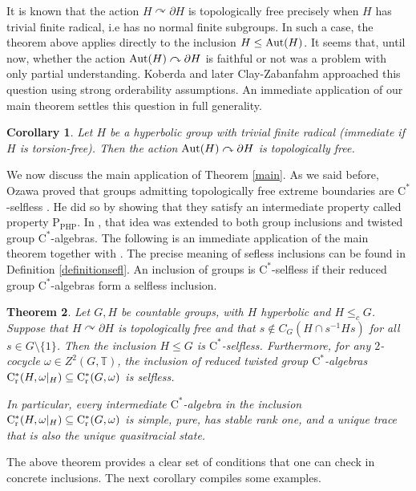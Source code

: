 \documentclass[11pt]{article}
\newtheorem{thm}{Theorem}[section]
\newtheorem{cor}[thm]{Corollary}
\theoremstyle{definition}
\theoremstyle{remark}
\numberwithin{equation}{section}
\numberwithin{equation}{section}
\newcommand{\Cs}{\ensuremath{\mathrm{C}^\ast}}
\newcommand{\Csr}{\mathrm{C}^\ast_{\rm r}}
\numberwithin{equation}{section}
\begin{document}
It is known that the action $H\curvearrowright\partial H$ is topologically free precisely when $H$ has trivial finite radical, i.e has no normal finite subgroups. In such a case, the theorem above applies directly to the inclusion $H\leq {\rm Aut}(H)$. It seems that, until now, whether the action ${\rm Aut}(H)\curvearrowright\partial H$ is faithful or not was a problem with only partial understanding. Koberda \cite{Ko11} and later Clay-Zabanfahm \cite{ClZa17} approached this question using strong orderability assumptions. An immediate application of our main theorem settles this question in full generality.

\begin{cor}\label{gp-main}
    Let $H$ be a hyperbolic group with trivial finite radical (immediate if $H$ is torsion-free). Then the action ${\rm Aut}(H)\curvearrowright\partial H$ is topologically free.
\end{cor}

We now discuss the main application of Theorem \ref{main}. As we said before, Ozawa proved that groups admitting topologically free extreme boundaries are \Cs-selfless \cite{Oz25}. He did so by showing that they satisfy an intermediate property called property $\mathrm{P}_{\mathrm{PHP}}$. In \cite{FKOCP26}, that idea was extended to both group inclusions and twisted group \Cs-algebras. The following is an immediate application of the main theorem together with \cite[Theorem A]{FKOCP26}. The precise meaning of sefless inclusions can be found in Definition \ref{definitionsefl}. An inclusion of groups is \Cs-selfless if their reduced group \Cs-algebras form a selfless inclusion.

\begin{thm}\label{self-main}
    Let $G,H$ be countable groups, with $H$ hyperbolic and $H\leq_c G$. Suppose that $H\curvearrowright\partial H$ is topologically free and that $s\not\in C_G( H \cap s^{-1} H s)$ for all $s\in G\setminus\{1\}$. Then the inclusion $H\leq G$ is \Cs-selfless. Furthermore, for any $2$-cocycle $\omega\in Z^2(G,\mathbb T)$, the inclusion of reduced twisted group \Cs-algebras $\Csr(H,\omega|_H) \subseteq \Csr(G,\omega)$ is selfless.

    In particular, every intermediate \Cs-algebra in the inclusion $\Csr(H,\omega|_H) \subseteq \Csr(G,\omega)$ is simple, pure, has stable rank one, and a unique trace that is also the unique quasitracial state.
\end{thm}

The above theorem provides a clear set of conditions that one can check in concrete inclusions. The next corollary compiles some examples.
\end{document}
